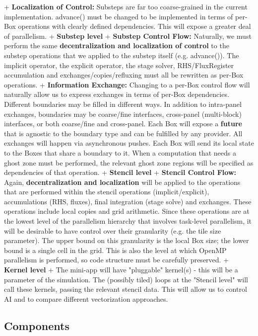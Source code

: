 \documentclass[final,letterpaper,10pt]{article}
\begin{document}
        + \textbf{Localization of Control:} Substeps are far too coarse-grained in the current implementation. advance() must be changed to be implemented in terms of per-Box operations with clearly defined dependencies. This will expose a greater deal of parallelism.
+ \textbf{Substep level}
    + \textbf{Substep Control Flow:} Naturally, we must perform the same \textbf{decentralization and localization of control} to the substep operations that we applied to the substep itself (e.g. advance()). The implicit operator, the explicit operator, the stage solver, RHS/FluxRegister accumulation and exchanges/copies/refluxing must all be rewritten as per-Box operations.
    + \textbf{Information Exchange:} Changing to a per-Box control flow will naturally allow us to express exchanges in terms of per-Box dependencies. Different boundaries may be filled in different ways. In addition to intra-panel exchanges, boundaries may be coarse/fine interfaces, cross-panel (multi-block) interfaces, or both coarse/fine and cross-panel. Each Box will expose a \textbf{future} that is agnostic to the boundary type and can be fulfilled by any provider. All exchanges will happen via asynchronous pushes. Each Box will send its local state to the Boxes that share a boundary to it. When a computation that needs a ghost zone must be performed, the relevant ghost zone regions will be specified as dependencies of that operation. 
+ \textbf{Stencil level}
    + \textbf{Stencil Control Flow:} Again, \textbf{decentralization and localization} will be applied to the operations that are performed within the stencil operations (implicit/explicit), accumulations (RHS, fluxes), final integration (stage solve) and exchanges. These operations include local copies and grid arithmetic. Since these operations are at the lowest level of the parallelism hierarchy that involves task-level parallelism, it will be desirable to have control over their granularity (e.g. the tile size parameter). The upper bound on this granularity is the local Box size; the lower bound is a single cell in the grid. This is also the level at which OpenMP parallelism is performed, so code structure must be carefully preserved.
+ \textbf{Kernel level}
    + The mini-app will have "pluggable" kernel(s) - this will be a parameter of the simulation. The (possibly tiled) loops at the "Stencil level" will call these kernels, passing the relevant stencil data. This will allow us to control AI and to compare different vectorization approaches.

\subsection{Components}
\end{document}

